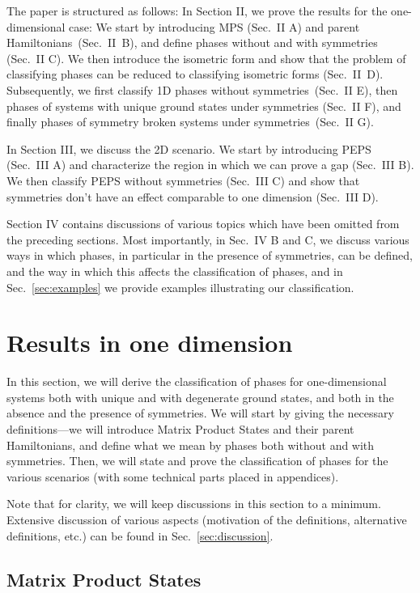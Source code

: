 \documentclass[twocolumn,superscriptaddress,prb,linenumbers]{revtex4-1}
\begin{document}
The paper is structured as follows: In Section II, we prove the results
for the one-dimensional case: We start by introducing MPS (Sec.~II A) and
parent Hamiltonians~(Sec.~II~B), and define  phases without and with
symmetries (Sec.~II C). We then introduce the isometric form and show that
the problem of classifying phases can be reduced to classifying isometric
forms (Sec.~II~D). Subsequently, we first classify 1D phases without
symmetries~(Sec.~II E), then phases of systems with unique ground states
under symmetries (Sec.~II F), and finally phases of symmetry broken
systems under symmetries~(Sec.~II G).

In Section III, we discuss the 2D scenario. We start by introducing PEPS
(Sec.~III A) and characterize the region in which we can prove a gap
(Sec.~III B).  We then classify PEPS without symmetries (Sec.~III C) and
show that symmetries don't have an effect comparable to one dimension
(Sec.~III D).

Section IV contains discussions of various topics which have been omitted
from the preceding sections.  Most importantly, in Sec.~IV B and C, we
discuss various ways in which phases, in particular in the presence of
symmetries, can be defined, and the way in which this affects the
classification of phases, and in Sec.~\ref{sec:examples} we provide
examples illustrating our classification.


\section{Results in one dimension}

In this section, we will derive the classification of phases for
one-dimensional systems both with unique and with degenerate
ground states, and both in the absence and the presence
of symmetries. We will start by giving the necessary definitions---we
will introduce Matrix Product States and their parent Hamiltonians, and
define what we mean by phases both without and with symmetries. Then, we
will state and prove the classification of phases for the various
scenarios (with some technical parts placed in appendices).

Note that for clarity, we will keep discussions in this section to a
minimum.  Extensive discussion of various aspects (motivation of the
definitions, alternative definitions, etc.) can be found in
Sec.~\ref{sec:discussion}.






\subsection{Matrix Product States}
\end{document}
